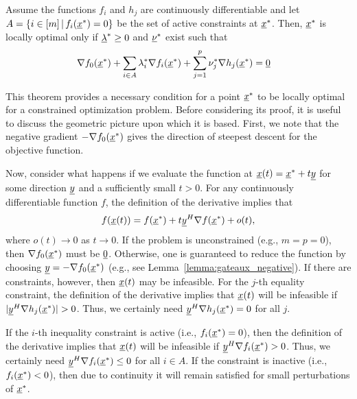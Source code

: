 \begin{theorem}
\label{theorem:KKT}
Assume the functions $f_i$ and $h_j$ are continuously differentiable and let $A = \{ i\in [m] \, | \, f_i (\underline{x}^*)=0 \}$ be the set of active constraints at $\underline{x}^*$.
Then, $\underline{x}^*$ is locally optimal only if $\underline{\lambda}^* \geq 0$ and $\underline{\nu}^*$ exist such that
\begin{align}
\label{eq:KKT1} \nabla f_0 (\underline{x}^*) + \sum_{i\in A} \lambda_i^* \nabla f_i (\underline{x}^*) + \sum_{j=1}^p \nu_j^* \nabla h_j (\underline{x}^*) &= \underline{0}
\end{align}
\end{theorem}

This theorem provides a necessary condition for a point $\underline{x}^*$ to be locally optimal for a constrained optimization problem.
Before considering its proof, it is useful to discuss the geometric picture upon which it is based.
First, we note that the negative gradient $-\nabla f_0 (\underline{x}^*)$ gives the direction of steepest descent for the objective function.

Now, consider what happens if we evaluate the function at $\underline{x}(t) = \underline{x}^* + t \underline{y}$ for some direction $\underline{y}$ and a sufficiently small $t>0$.
For any continuously differentiable function $f$, the definition of the derivative implies that
\[ f(\underline{x}(t)) = f(\underline{x}^*)+t \underline{y}^H \nabla f(\underline{x}^*)+ o(t), \]
where $o(t) \to 0$ as $t \to 0$.
If the problem is unconstrained (e.g., $m=p=0$), then $\nabla f_0 (\underline{x}^*)$ must be $\underline{0}$.
Otherwise, one is guaranteed to reduce the function by choosing $\underline{y}=-\nabla f_0 (\underline{x}^*)$ (e.g., see Lemma~\ref{lemma:gateaux_negative}).
If there are constraints, however, then $\underline{x}(t)$ may be infeasible.
For the $j$-th equality constraint, the definition of the derivative implies that $\underline{x}(t)$ will be infeasible if $|\underline{y}^H \nabla h_j (\underline{x}^*)| > 0$.
Thus, we certainly need $\underline{y}^H \nabla h_j (\underline{x}^*) = 0$ for all $j$.

If the $i$-th inequality constraint is active (i.e., $f_i (\underline{x}^*)=0$), then the definition of the derivative implies that $\underline{x}(t)$ will be infeasible if $\underline{y}^H \nabla f_i (\underline{x}^*) > 0$.
Thus, we certainly need $\underline{y}^H \nabla f_i (\underline{x}^*) \leq 0$ for all $i\in A$. 
If the constraint is inactive (i.e., $f_i (\underline{x}^*)<0$), then due to continuity it will remain satisfied for small perturbations of $\underline{x}^*$.

